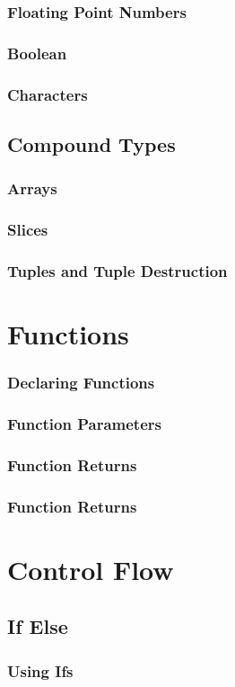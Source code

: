 \documentclass{beamer}
\begin{document}
\begin{frame}
  \frametitle{Floating Point Numbers}
\end{frame}

\begin{frame}
  \frametitle{Boolean}
\end{frame}

\begin{frame}
  \frametitle{Characters}
\end{frame}

\subsection{Compound Types}
\begin{frame}
  \frametitle{Arrays}
\end{frame}

\begin{frame}
  \frametitle{Slices}
\end{frame}

\begin{frame}
  \frametitle{Tuples and Tuple Destruction}
\end{frame}

\section{Functions}
\begin{frame}
  \frametitle{Declaring Functions}
\end{frame}

\begin{frame}
  \frametitle{Function Parameters}
\end{frame}

\begin{frame}
  \frametitle{Function Returns}
\end{frame}

\begin{frame}
  \frametitle{Function Returns}
\end{frame}

\section{Control Flow}
\subsection{If Else}
\begin{frame}
  \frametitle{Using Ifs}
\end{frame}
\end{document}
